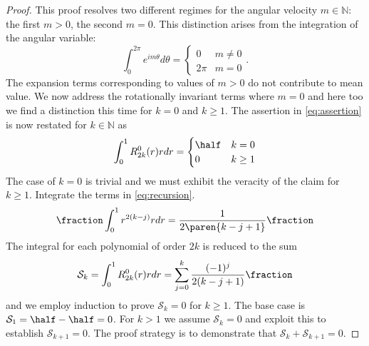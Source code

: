 \begin{proof}
This proof resolves two different regimes for the angular velocity $m\in\mathbb{N}$: the first $m>0$, the second $m=0$. This distinction arises from the integration of the angular variable:
  \begin{equation}
    \int_{0}^{2\pi} e^{im\theta} d\theta = 
    \begin{cases}
      0 & m \ne 0 \\
      2\pi & m = 0
    \end{cases} .
  \end{equation}
The expansion terms corresponding to values of $m>0$ do not contribute to mean value. We now address the rotationally invariant terms where $m=0$ and here too we find a distinction this time for $k=0$ and $k\ge1$. The assertion in \eqref{eq:assertion} is now restated for $k\in\mathbb{N}$ as
  \begin{equation}
    \int_{0}^{1} R_{2k}^{0}(r) r dr = 
      \begin{cases}
        \half & k = 0 \\
        0 & k\ge 1
      \end{cases}
  \end{equation}
The case of $k=0$ is trivial and we must exhibit the veracity of the claim for $k\ge 1$.
Integrate the terms in \eqref{eq:recursion}.
  \begin{equation}
    \fraction \int_{0}^{1} r^{2(k-j)} r dr = 
    \frac{1} {2\paren{k-j+1}} \fraction
  \end{equation}
The integral for each polynomial of order $2k$ is reduced to the sum
  \begin{equation}
    \mathcal{S}_{k} = \int_{0}^{1} R_{2k}^{0}(r) r dr = \sum_{j=0}^{k} \frac{(-1)^{j}} {2(k-j+1)} \fraction
   \label{eq:sk}
  \end{equation}
and we employ induction to prove $\mathcal{S}_{k} = 0$ for $k\ge1$. The base case is  $\mathcal{S}_{1} = \half - \half = 0$. For $k>1$ we assume $\mathcal{S}_{k} = 0$ and exploit this to establish $\mathcal{S}_{k+1} = 0$. The proof strategy is to demonstrate that $\mathcal{S}_{k} + \mathcal{S}_{k+1} = 0$.


\end{proof}
